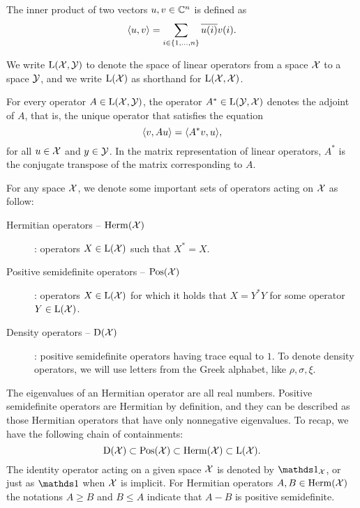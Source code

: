 The inner product of two vectors $u, v \in \mathbb{C}^{n}$ is defined as
\begin{equation}
  \langle u , v\rangle = \sum_{i\in\{1,\ldots,n\}}\overline{u(i)}v(i).
\end{equation}

We write $\mathrm{L}(\mathcal{X},\mathcal{Y})$ to denote the space of linear operators from a space $\mathcal{X}$ 
to a space $\mathcal{Y}$, and we write $\mathrm{L}(\mathcal{X})$ as shorthand for $\mathrm{L}(\mathcal{X},\mathcal{X})$.

For every operator $A\in\mathrm{L}(\mathcal{X},\mathcal{Y})$, the operator $A^{\ast}\in\mathrm{L}(\mathcal{Y},\mathcal{X})$
denotes the adjoint of $A$, that is, the unique operator that satisfies the equation
\begin{equation}
  \langle v , Au\rangle = \langle A^{\ast}v , u\rangle,
\end{equation}
for all $u\in\mathcal{X}$ and $y\in\mathcal{Y}$.
In the matrix representation of linear operators, $A^{\ast}$ is the conjugate transpose of 
the matrix corresponding to $A$.

\renewcommand{\descriptionlabel}[1]{\hspace{\labelsep}\emph{#1}}

For any space $\mathcal{X}$, we denote some important sets of operators acting on $\mathcal{X}$ as follow:
\begin{description}
\item[Hermitian operators -- $\mathrm{Herm}(\mathcal{X})$]: operators $X\in\mathrm{L}(\mathcal{X})$ such that $X^{\ast} = X$.
\item[Positive semidefinite operators -- $\mathrm{Pos}(\mathcal{X})$]: operators $X\in\mathrm{L}(\mathcal{X})$ for which it holds 
  that $X = Y^{\ast}Y$ for some operator $Y\in\mathrm{L}(\mathcal{X})$.
\item[Density operators -- $\mathrm{D}(\mathcal{X})$]: positive semidefinite operators
  having trace equal to $1$. To denote density operators, we will use letters from 
  the Greek alphabet, like $\rho,\sigma,\xi$.
\end{description}
The eigenvalues of an Hermitian operator are all real numbers. 
Positive semidefinite operators are Hermitian by definition, and they can be
described as those Hermitian operators that have only nonnegative eigenvalues.
To recap, we have the following chain of containments:
\begin{equation}
  \mathrm{D}(\mathcal{X}) \subset \mathrm{Pos}(\mathcal{X}) \subset \mathrm{Herm}(\mathcal{X}) \subset \mathrm{L}(\mathcal{X}).
\end{equation}
The identity operator acting on a given space $\mathcal{X}$ is denoted by $\I_{\X}$, 
or just as $\I$ when $\mathcal{X}$ is implicit.
For Hermitian operators $A, B \in \mathrm{Herm}(\mathcal{X})$ the notations $A\geq B$ 
and $B \leq A$ indicate that $A - B$ is positive semidefinite.

